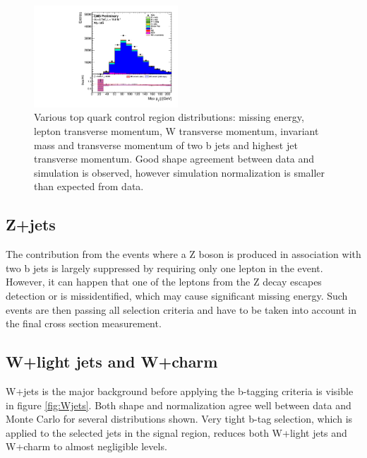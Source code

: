 \begin{figure}[htbp]
		\includegraphics[width=0.48\textwidth]{Figures/Results/Muon/prefit/TT_max_hJet_pt_doQCD1.pdf}		
	\caption[Top quark control region]{Various top quark control region distributions: missing energy, lepton transverse momentum, W transverse momentum, invariant mass and transverse momentum of two b jets and highest jet transverse momentum. Good shape agreement between data and simulation is observed, however simulation normalization is smaller than expected from data.}
	\label{fig:TT_CR}
\end{figure}

\subsection{Z+jets}

The contribution from the events where a Z boson is produced in association with two b jets is largely suppressed by requiring only one lepton in the event. However, it can happen that one of the leptons from the Z decay escapes detection or is missidentified, which may cause significant missing energy. Such events are then passing all selection criteria and have to be taken into account in the final cross section measurement. 

\subsection{W+light jets and W+charm}

W+jets is the major background before applying the b-tagging criteria is visible in figure \ref{fig:Wjets}. Both shape and normalization agree well between data and Monte Carlo for several distributions shown. Very tight b-tag selection, which is applied to the selected jets in the signal region, reduces both W+light jets and W+charm to almost negligible levels.  

